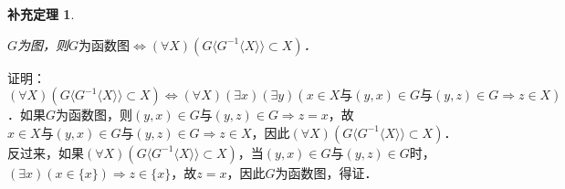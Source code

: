 \documentclass[12pt, a4paper, oneside]{book}
\newtheorem{cor}{补充定理}
\begin{document}
			\begin{cor}\label{cor69}
				\hfill\par
				$G$为图，则$G\text{为函数图}\Leftrightarrow (\forall X)(G\langle G^{-1}\langle X \rangle \rangle\subset X)$．
			\end{cor}
			证明：$(\forall X)(G\langle G^{-1}\langle X \rangle \rangle\subset X) \Leftrightarrow (\forall X)(\exists x)(\exists y)(x\in X\text{与}(y, x) \in G\text{与}(y, z)\in G\Rightarrow z\in X)$．如果$G$为函数图，则$(y, x)\in G\text{与}(y, z)\in G\Rightarrow z=x$，故$x\in X\text{与}(y, x)\in G\text{与}(y, z)\in G\Rightarrow z\in X$，因此$(\forall X)(G\langle G^{-1}\langle X \rangle \rangle\subset X)$．反过来，如果$(\forall X)(G\langle G^{-1}\langle X \rangle \rangle\subset X)$，当$(y, x)\in G\text{与}(y, z)\in G$时，$(\exists x)(x\in \{x\})\Rightarrow z\in \{x\}$，故$z=x$，因此$G$为函数图，得证．
			
\end{document}
